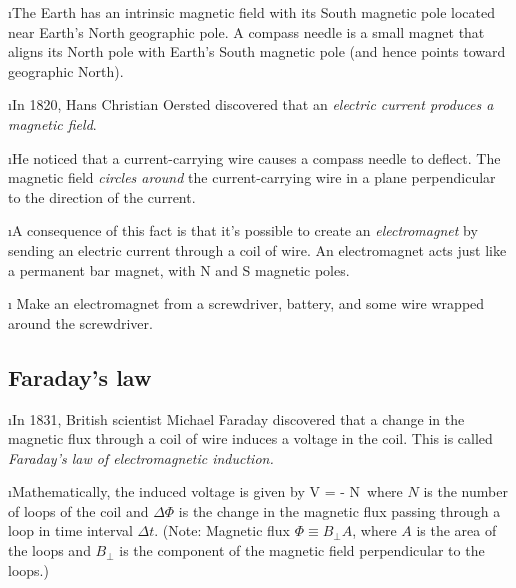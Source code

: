 \i The Earth has an intrinsic magnetic field with its South 
magnetic pole located near Earth's North geographic pole.
A compass needle is a small magnet that aligns its North pole
with Earth's South magnetic pole (and hence points toward geographic
North).

\i In 1820, Hans Christian Oersted discovered that an {\em electric 
current produces a magnetic field}.

\i He noticed that a current-carrying wire causes a compass 
needle to deflect.
The magnetic field {\em circles around} the current-carrying wire 
in a plane perpendicular to the direction of the current.

\i A consequence of this fact is that it's possible to create an 
{\em electromagnet} by sending an electric current through a coil of wire.
An electromagnet acts just like a permanent bar magnet, with N and S 
magnetic poles.

\i \demo
Make an electromagnet from a screwdriver, battery, and
some wire wrapped around the screwdriver.

\ei

\subsection{Faraday's law}

\bi

\i In  1831, British scientist Michael Faraday discovered 
that a change in the magnetic flux through a coil of wire 
induces a voltage in the coil.
This is called {\em Faraday's law of electromagnetic induction.}

\i Mathematically, the induced voltage is given by
%
\be
V = - N\,
\ee
%
where $N$ is the number of loops of the coil and $\Delta\Phi$ 
is the change in the magnetic flux 
passing through a loop in time interval $\Delta t$. 
(Note: Magnetic flux $\Phi\equiv B_\perp A$, 
where $A$ is the area of the loops and
$B_\perp$ is the component of the magnetic field perpendicular
to the loops.)

